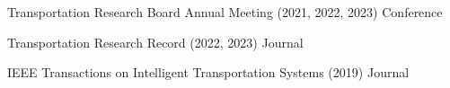 

\begin{cvservices}

  \cvservice
    {Transportation Research Board Annual Meeting} %
    {(2021, 2022, 2023)} %
    {} %
    {Conference} %

  \cvservice
    {Transportation Research Record} %
    {(2022, 2023)} %
    {} %
    {Journal} %

  \cvservice
    {IEEE Transactions on Intelligent Transportation Systems} %
    {(2019)} %
    {} %
    {Journal} %

\end{cvservices}

